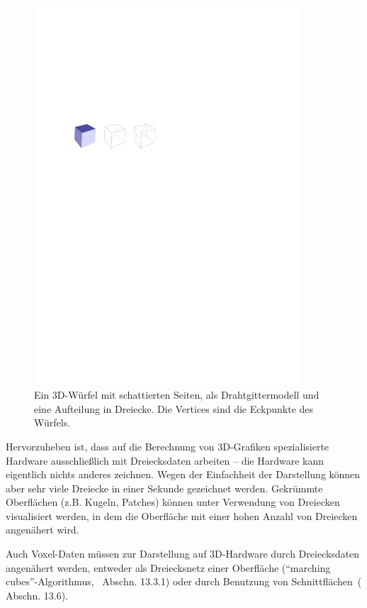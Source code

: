 \documentclass[twoside,a4paper,fleqn,12pt]{book}
\begin{document}
\begin{figure}[h]
  \centering
  \includegraphics[width=10cm]{drahtgitter}
  \caption{Ein 3D-Würfel mit schattierten Seiten, als Drahtgittermodell und eine Aufteilung in Dreiecke. Die Vertices
  sind die Eckpunkte des Würfels.}
  \label{fig:wirecube}
\end{figure}

Hervorzuheben ist, dass auf die Berechnung von 3D-Grafiken spezialisierte Hardware 
ausschließlich mit Dreiecksdaten arbeiten -- die Hardware kann eigentlich nichts anderes zeichnen. Wegen der Einfachheit der Darstellung
können aber sehr viele Dreiecke in einer Sekunde gezeichnet werden. Gekrümmte Oberflächen (z.B. Kugeln, Patches) können unter Verwendung von Dreiecken visualisiert werden,
in dem die Oberfläche mit einer hohen Anzahl von Dreiecken angenähert wird.

Auch Voxel-Daten müssen zur Darstellung auf 3D-Hardware durch Dreiecksdaten angenähert werden,
entweder als Dreiecksnetz einer Oberfläche (``marching cubes''-Algorithmus,~\cite{watt_de} Abschn. 13.3.1)
oder durch Benutzung von Schnittflächen~(\cite{watt_de} Abschn. 13.6).
\end{document}
